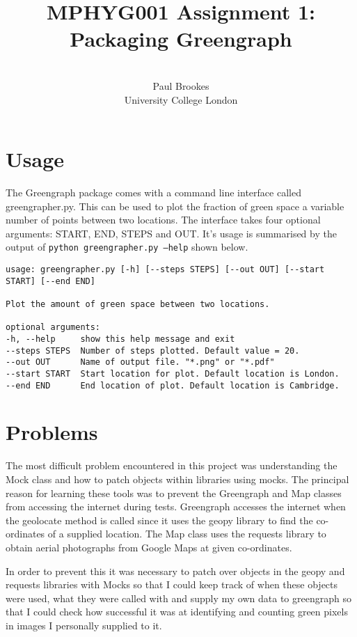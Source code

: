 \documentclass{article}
\title{MPHYG001 Assignment 1: Packaging Greengraph}
\author{\\
Paul Brookes\\
\normalsize University College London\\
}
\begin{document}
\maketitle
\section*{Usage}
The Greengraph package comes with a command line interface called greengrapher.py. This can be used to plot the fraction of green space a variable number of points between two locations. The interface takes four optional arguments: START, END, STEPS and OUT. It's usage is summarised by the output of \texttt{python greengrapher.py ---help} shown below.

\begin{lstlisting}
usage: greengrapher.py [-h] [--steps STEPS] [--out OUT] [--start START] [--end END]

Plot the amount of green space between two locations.

optional arguments:
-h, --help     show this help message and exit
--steps STEPS  Number of steps plotted. Default value = 20.
--out OUT      Name of output file. "*.png" or "*.pdf"
--start START  Start location for plot. Default location is London.
--end END      End location of plot. Default location is Cambridge.
\end{lstlisting}

\section*{Problems}

The most difficult problem encountered in this project was understanding the Mock class and how to patch objects within libraries using mocks. The principal reason for learning these tools was to prevent the Greengraph and Map classes from accessing the internet during tests. Greengraph accesses the internet when the geolocate method is called since it uses the geopy library to find the co-ordinates of a supplied location. The Map class uses the requests library to obtain aerial photographs from Google Maps at given co-ordinates.

In order to prevent this it was necessary to patch over objects in the geopy and requests libraries with Mocks so that I could keep track of when these objects were used, what they were called with and supply my own data to greengraph so that I could check how successful it was at identifying and counting green pixels in images I personally supplied to it.
\end{document}
